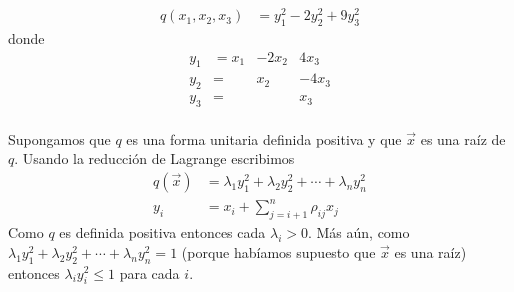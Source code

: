 \begin{example}
\begin{equation*}
\begin{split}
q\left(x_{1}, x_{2}, x_{3}\right) & = y_{1}^{2} - 2y_{2}^{2} + 9y_{3}^{2}
\end{split}
\end{equation*}
donde 
\begin{equation*}
\begin{matrix}
y_{1} & =   x_{1}	& - 2x_{2}	&    4x_{3}\\
y_{2} & =		&     x_{2}	&  - 4x_{3}\\
y_{3} & =		&              	&      x_{3}
\end{matrix} 
\end{equation*}
\end{example}
\paragraph{}
Supongamos que $q$ es una forma unitaria definida positiva y que $\overrightarrow{x}$ es una raíz de $q$. Usando la reducción de Lagrange escribimos
\begin{equation*}
\begin{split}
q\left(\overrightarrow{x}\right) & =\lambda_{1}y_{1}^{2} + \lambda_{2}y_{2}^{2} + \cdots + \lambda_{n}y_{n}^{2}\\
y_{i} & = x_{i} + \sum_{j=i+1}^{n}\rho_{ij}x_{j}
\end{split}
\end{equation*}
Como $q$ es definida positiva entonces cada $\lambda_{i} > 0$. Más aún, como $\lambda_{1}y_{1}^{2} + \lambda_{2}y_{2}^{2} + \cdots + \lambda_{n}y_{n}^{2} = 1$ (porque habíamos supuesto que $\overrightarrow{x}$ es una raíz) entonces $\lambda_{i}y_{i}^{2} \leq 1$ para cada $i$.

\newpage
